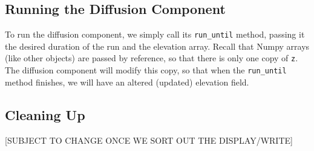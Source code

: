 \documentclass[12pt]{article}
\newcommand{\code}[1]{{\tt #1}}
\begin{document}
\subsection{Running the Diffusion Component}



To run the diffusion component, we simply call its \code{run\_until} method, passing it the desired duration of the run and the elevation array. Recall that Numpy arrays (like other objects) are passed by reference, so that there is only one copy of \code{z}. The diffusion component will modify this copy, so that when the \code{run\_until} method finishes, we will have an altered (updated) elevation field.

\subsection{Cleaning Up}



[SUBJECT TO CHANGE ONCE WE SORT OUT THE DISPLAY/WRITE]









\newpage


\end{document}
